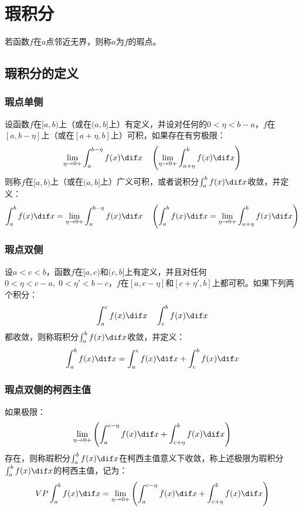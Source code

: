 \section{瑕积分}
\begin{definition}
	若函数$f$在$a$点邻近无界，则称$a$为$f$的瑕点。
\end{definition}

\subsection{瑕积分的定义}
\subsubsection{瑕点单侧}
\begin{definition}
	设函数$f$在$[a,b)$上（或在$(a,b]$上）有定义，并设对任何的$0<\eta<b-a$，$f$在$[a,b-\eta]$上（或在$[a+\eta,b]$上）可积，如果存在有穷极限：
	\begin{equation*}
		\lim_{\eta\to0+}\int_{a}^{b-\eta}f(x)\dif x\quad
		\left(\lim_{\eta\to0+}\int_{a+\eta}^{b}f(x)\dif x\right)
	\end{equation*}
	则称$f$在$[a,b)$上（或在$(a,b]$上）广义可积，或者说积分$\int_{a}^{b}f(x)\dif x$收敛，并定义：
	\begin{equation*}
		\int_{a}^{b}f(x)\dif x=\lim_{\eta\to0+}\int_{a}^{b-\eta}f(x)\dif x\quad
		\left(\int_{a}^{b}f(x)\dif x=\lim_{\eta\to0+}\int_{a+\eta}^{b}f(x)\dif x\right)
	\end{equation*}
\end{definition}
\subsubsection{瑕点双侧}
\begin{definition}
	设$a<c<b$，函数$f$在$[a,c)$和$(c,b]$上有定义，并且对任何$0<\eta<c-a,\;0<\eta'<b-c$，$f$在$[a,c-\eta]$和$[c+\eta',b]$上都可积。如果下列两个积分：
	\begin{equation*}
		\int_{a}^{c}f(x)\dif x\quad\int_{c}^{b}f(x)\dif x
	\end{equation*}
	都收敛，则称瑕积分$\int_{a}^{b}f(x)\dif x$收敛，并定义：
	\begin{equation*}
		\int_{a}^{b}f(x)\dif x=\int_{a}^{c}f(x)\dif x+\int_{c}^{b}f(x)\dif x
	\end{equation*}
\end{definition}
\subsubsection{瑕点双侧的柯西主值}
\begin{definition}
	如果极限：
	\begin{equation*}
		\lim_{\eta\to0+}\left(\int_{a}^{c-\eta}f(x)\dif x+\int_{c+\eta}^{b}f(x)\dif x\right)
	\end{equation*}
	存在，则称瑕积分$\int_{a}^{b}f(x)\dif x$在柯西主值意义下收敛，称上述极限为瑕积分$\int_{a}^{b}f(x)\dif x$的柯西主值，记为：
	\begin{equation*}
		VP\int_{a}^{b}f(x)\dif x=\lim_{\eta\to0+}\left(\int_{a}^{c-\eta}f(x)\dif x+\int_{c+\eta}^{b}f(x)\dif x\right)
	\end{equation*}
\end{definition}

